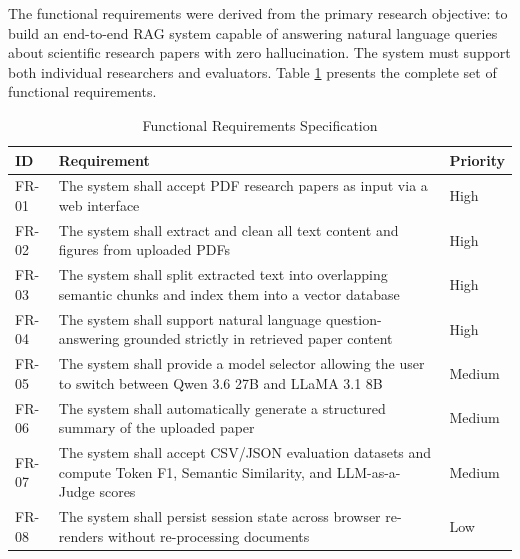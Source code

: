 The functional requirements were derived from the primary research objective: to build an end-to-end RAG system capable of answering natural language queries about scientific research papers with zero hallucination. The system must support both individual researchers and evaluators. Table \ref{tab:fr} presents the complete set of functional requirements.

\begin{table}[H]

\centering

\caption{Functional Requirements Specification}

\label{tab:fr}

\begin{tabular}{|p{1.2cm}|p{9cm}|p{2cm}|}

\hline

\textbf{ID} & \textbf{Requirement} & \textbf{Priority} \\

\hline

FR-01 & The system shall accept PDF research papers as input via a web interface & High \\

\hline

FR-02 & The system shall extract and clean all text content and figures from uploaded PDFs & High \\

\hline

FR-03 & The system shall split extracted text into overlapping semantic chunks and index them into a vector database & High \\

\hline

FR-04 & The system shall support natural language question-answering grounded strictly in retrieved paper content & High \\

\hline

FR-05 & The system shall provide a model selector allowing the user to switch between Qwen 3.6 27B and LLaMA 3.1 8B & Medium \\

\hline

FR-06 & The system shall automatically generate a structured summary of the uploaded paper & Medium \\

\hline

FR-07 & The system shall accept CSV/JSON evaluation datasets and compute Token F1, Semantic Similarity, and LLM-as-a-Judge scores & Medium \\

\hline

FR-08 & The system shall persist session state across browser re-renders without re-processing documents & Low \\

\hline

\end{tabular}

\end{table}

